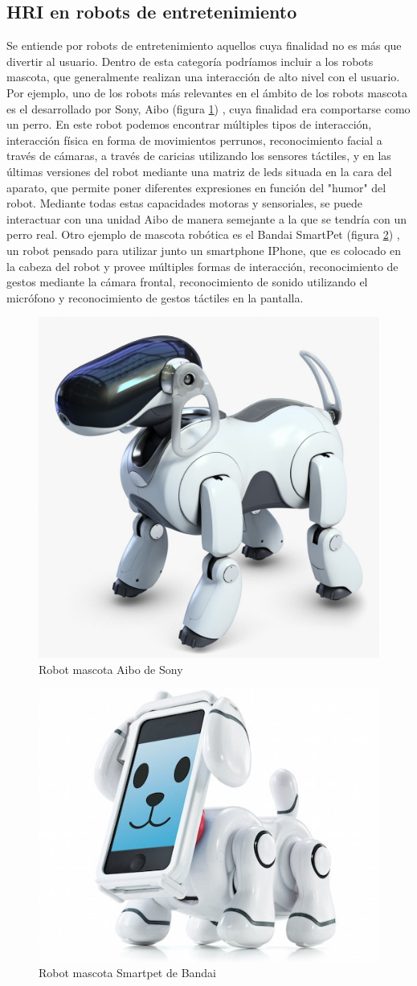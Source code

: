  \subsection{HRI en robots de entretenimiento}
 Se entiende por robots de entretenimiento aquellos cuya finalidad no es más que divertir al usuario. Dentro de esta categoría podríamos incluir a los robots mascota, que generalmente realizan una interacción de alto nivel con el usuario.
 Por ejemplo, uno de los robots más relevantes en el ámbito de los robots mascota es el desarrollado por Sony, Aibo \cite{aibo} (figura \ref{fig:aiborobot}) , cuya finalidad era comportarse como un perro. En este robot podemos encontrar múltiples tipos de interacción, interacción física en forma de movimientos perrunos, reconocimiento facial a través de cámaras, a través de caricias utilizando los sensores táctiles, y en las últimas versiones del robot mediante una matriz de leds situada en la cara del aparato, que permite poner diferentes expresiones en función del "humor" del robot. Mediante todas estas capacidades motoras y sensoriales, se puede interactuar con una unidad Aibo de manera semejante a la que se tendría con un perro real.
 Otro ejemplo de mascota robótica es el Bandai SmartPet (figura \ref{fig:bandaismartpet}) , un robot pensado para utilizar junto un smartphone IPhone, que es colocado en la cabeza del robot y provee múltiples formas de interacción, reconocimiento de gestos mediante la cámara frontal, reconocimiento de sonido utilizando el micrófono y reconocimiento de gestos táctiles en la pantalla.
 
 \begin{figure}
	\centering
	\includegraphics[width=0.5\linewidth]{imagenes/aiborobot.jpg}
	\caption{Robot mascota Aibo de Sony}
	\label{fig:aiborobot}
 \end{figure}
  \begin{figure}
	\centering
	\includegraphics[width=0.5\linewidth]{imagenes/bandaismartpet.jpg}
	\caption{Robot mascota Smartpet de Bandai}
	\label{fig:bandaismartpet}
 \end{figure}

